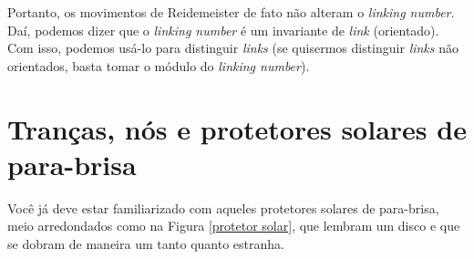 	\par\vspace{0.3cm} Portanto, os movimentos de Reidemeister de fato não alteram o \textit{linking number}. Daí, podemos dizer que o \textit{linking number} é um invariante de \textit{link} (orientado). Com isso, podemos usá-lo para distinguir \textit{links} (se quisermos distinguir \textit{links} não orientados, basta tomar o módulo do \textit{linking number}).
	
	\section{Tranças, nós e protetores solares de para-brisa}
	\hspace{12pt} Você já deve estar familiarizado com aqueles protetores solares de para-brisa, meio arredondados como na Figura \eqref{protetor solar}, que lembram um disco e que se dobram de maneira um tanto quanto estranha.
	
